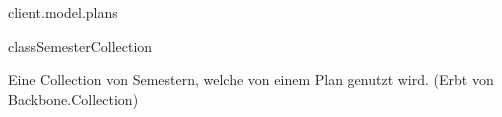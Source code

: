 \begin{texdocpackage}{client.model.plans}
\begin{texdocclass}{class}{SemesterCollection}
\label{texdoclet:edu.kit.informatik.studyplan.client.model.plans.SemesterCollection}
\begin{texdocclassintro}
Eine Collection von Semestern, welche von einem Plan genutzt wird. (Erbt von
 Backbone.Collection)\end{texdocclassintro}
\begin{texdocclassfields}
\end{texdocclassfields}
\begin{texdocclassconstructors}
\end{texdocclassconstructors}
\end{texdocclass}


\end{texdocpackage}



